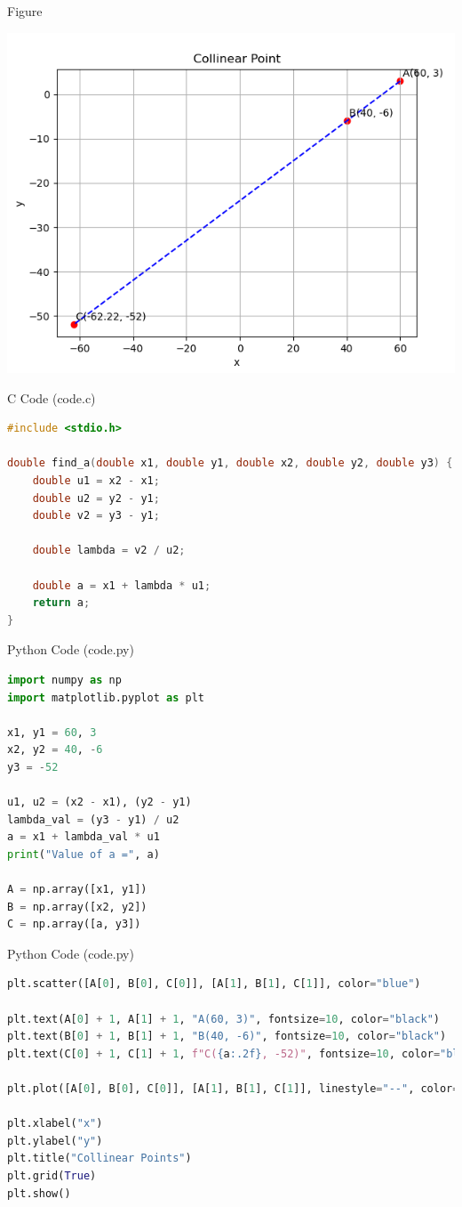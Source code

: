 \documentclass{beamer}
\begin{document}
\begin{frame}{Figure}
\begin{center}
\includegraphics[width=0.6\columnwidth]{figs/fig.png}
\end{center}
\end{frame}
\begin{frame}[fragile]{C Code (code.c)}
\begin{lstlisting}[language=C]
#include <stdio.h>

double find_a(double x1, double y1, double x2, double y2, double y3) {
    double u1 = x2 - x1;
    double u2 = y2 - y1;
    double v2 = y3 - y1;

    double lambda = v2 / u2;

    double a = x1 + lambda * u1;
    return a;
}
\end{lstlisting}
\end{frame}
\begin{frame}[fragile]{Python Code (code.py)}
\begin{lstlisting}[language=Python]
import numpy as np
import matplotlib.pyplot as plt

x1, y1 = 60, 3
x2, y2 = 40, -6
y3 = -52

u1, u2 = (x2 - x1), (y2 - y1)
lambda_val = (y3 - y1) / u2
a = x1 + lambda_val * u1
print("Value of a =", a)

A = np.array([x1, y1])
B = np.array([x2, y2])
C = np.array([a, y3])

\end{lstlisting}
\end{frame}
\begin{frame}[fragile]{Python Code (code.py)}
\begin{lstlisting}[language=Python]
plt.scatter([A[0], B[0], C[0]], [A[1], B[1], C[1]], color="blue")

plt.text(A[0] + 1, A[1] + 1, "A(60, 3)", fontsize=10, color="black")
plt.text(B[0] + 1, B[1] + 1, "B(40, -6)", fontsize=10, color="black")
plt.text(C[0] + 1, C[1] + 1, f"C({a:.2f}, -52)", fontsize=10, color="black")

plt.plot([A[0], B[0], C[0]], [A[1], B[1], C[1]], linestyle="--", color="red")

plt.xlabel("x")
plt.ylabel("y")
plt.title("Collinear Points")
plt.grid(True)
plt.show()
\end{lstlisting}
\end{frame}
\end{document}
